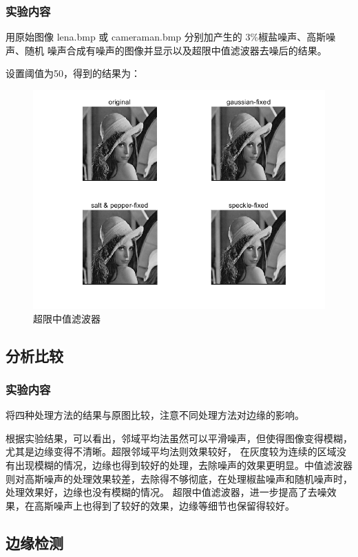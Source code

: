 \documentclass{ctexart}
\begin{document}
\subsubsection{\hei 实验内容}
用原始图像 lena.bmp 或 cameraman.bmp 分别加产生的 3\%椒盐噪声、高斯噪声、随机
噪声合成有噪声的图像并显示以及超限中值滤波器去噪后的结果。
\par 设置阈值为50，得到的结果为：
\begin{figure}[H]
    \centering
    \includegraphics[scale=0.35]{3_4.png}
    \caption{超限中值滤波器}
\end{figure}
\subsection{\hei 分析比较}
\subsubsection{\hei 实验内容}
将四种处理方法的结果与原图比较，注意不同处理方法对边缘的影响。
\par 根据实验结果，可以看出，邻域平均法虽然可以平滑噪声，但使得图像变得模糊，尤其是边缘变得不清晰。超限邻域平均法则效果较好，
在灰度较为连续的区域没有出现模糊的情况，边缘也得到较好的处理，去除噪声的效果更明显。中值滤波器则对高斯噪声的处理效果较差，去除得不够彻底，在处理椒盐噪声和随机噪声时，处理效果好，边缘也没有模糊的情况。
超限中值滤波器，进一步提高了去噪效果，在高斯噪声上也得到了较好的效果，边缘等细节也保留得较好。
\subsection{\hei 边缘检测}
\end{document}
